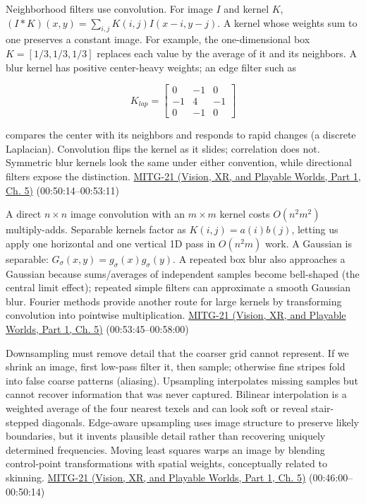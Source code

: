 Neighborhood filters use convolution. For image \(I\) and kernel \(K\), \((I*K)(x,y)=\sum_{i,j}K(i,j)I(x-i,y-j)\). A kernel whose weights sum to one preserves a constant image. For example, the one-dimensional box \(K=[1/3,1/3,1/3]\) replaces each value by the average of it and its neighbors. A blur kernel has positive center-heavy weights; an edge filter such as

\[
K_{lap}=\begin{bmatrix}0&-1&0\\-1&4&-1\\0&-1&0\end{bmatrix}
\]

compares the center with its neighbors and responds to rapid changes (a discrete Laplacian). Convolution flips the kernel as it slides; correlation does not. Symmetric blur kernels look the same under either convention, while directional filters expose the distinction. \href{../07-Vision-XR-and-Playable-Worlds-P01/main.pdf\#nameddest=04-visual-computing-ii-ch036-mitg-21---image-processing}{MITG-21 (Vision, XR, and Playable Worlds, Part 1, Ch. 5)} (00:50:14--00:53:11)

A direct \(n\times n\) image convolution with an \(m\times m\) kernel costs \(O(n^2m^2)\) multiply-adds. Separable kernels factor as \(K(i,j)=a(i)b(j)\), letting us apply one horizontal and one vertical 1D pass in \(O(n^2m)\) work. A Gaussian is separable: \(G_\sigma(x,y)=g_\sigma(x)g_\sigma(y)\). A repeated box blur also approaches a Gaussian because sums/averages of independent samples become bell-shaped (the central limit effect); repeated simple filters can approximate a smooth Gaussian blur. Fourier methods provide another route for large kernels by transforming convolution into pointwise multiplication. \href{../07-Vision-XR-and-Playable-Worlds-P01/main.pdf\#nameddest=04-visual-computing-ii-ch036-mitg-21---image-processing}{MITG-21 (Vision, XR, and Playable Worlds, Part 1, Ch. 5)} (00:53:45--00:58:00)

Downsampling must remove detail that the coarser grid cannot represent. If we shrink an image, first low-pass filter it, then sample; otherwise fine stripes fold into false coarse patterns (aliasing). Upsampling interpolates missing samples but cannot recover information that was never captured. Bilinear interpolation is a weighted average of the four nearest texels and can look soft or reveal stair-stepped diagonals. Edge-aware upsampling uses image structure to preserve likely boundaries, but it invents plausible detail rather than recovering uniquely determined frequencies. Moving least squares warps an image by blending control-point transformations with spatial weights, conceptually related to skinning. \href{../07-Vision-XR-and-Playable-Worlds-P01/main.pdf\#nameddest=04-visual-computing-ii-ch036-mitg-21---image-processing}{MITG-21 (Vision, XR, and Playable Worlds, Part 1, Ch. 5)} (00:46:00--00:50:14)

